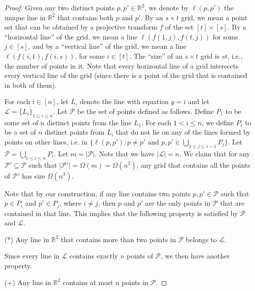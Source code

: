 \documentclass[10pt,a4paper]{amsart}
\begin{document}
\begin{proof}		
	Given any two distinct points $p,p'\in\mathbb{R}^2$, we denote by $\ell(p,p')$ the unique line in $\mathbb{R}^2$ that contains both $p$ and $p'$.
	By an $s\times t$ grid, we mean a point set that can be obtained by a projective transform $f$ of the set $[t]\times [s]$. By a ``horizontal line'' of the grid, we mean a line $\ell(f(1,j),f(t,j))$ for some $j\in [s]$, and by a ``vertical line'' of the grid, we mean a line $\ell(f(i,1),f(i,s))$, for some $i\in [t]$. The ``size'' of an $s\times t$ grid is $st$, i.e., the number of points in it. Note that every horizontal line of a grid intersects every vertical line of the grid (since there is a point of the grid that is contained in both of them).
	
	\medskip	
	
	For each $i\in [n]$, let $L_i$ denote the line with equation $y=i$ and let $\mathcal{L}=\{L_i\}_{1\leq i\leq n}$.
	Let $\mathcal{P}$ be the set of points defined as follows. Define $P_1$ to be some set of $n$ distinct points from the line $L_1$. For each $1<i\leq n$, we define $P_i$ to be a set of $n$ distinct points from $L_i$ that do not lie on any of the lines formed by points on other lines, i.e. in $\{\ell(p,p')\colon p\neq p'$ and $p,p'\in\bigcup_{1\leq j\leq i-1} P_j\}$. Let $\mathcal{P}=\bigcup_{1\leq i\leq n} P_i$. Let $m=|\mathcal{P}|$. Note that we have $|\mathcal{L}|=n$. We claim that for any $\mathcal{P}'\subseteq\mathcal{P}$ such that $|\mathcal{P'}|=\Omega(m)=\Omega(n^2)$, any grid that contains all the points of $\mathcal{P}'$ has size $\Omega(n^3)$. 
	
	\medskip		
	
	Note that by our construction, if any line contains two points $p,p'\in\mathcal{P}$ such that $p\in P_i$ and $p'\in P_j$, where $i\neq j$, then $p$ and $p'$ are the only points in $\mathcal{P}$ that are contained in that line. This implies that the following property is satisfied by $\mathcal{P}$ and $\mathcal{L}$.
	\medskip
	
	\noindent (*) Any line in $\mathbb{R}^2$ that contains more than two points in $\mathcal{P}$ belongs to $\mathcal{L}$.
	\medskip
	
	Since every line in $\mathcal{L}$ contains exactly $n$ points of $\mathcal{P}$, we then have another property.
	\medskip
	
	\noindent (+) Any line in $\mathbb{R}^2$ contains at most $n$ points in $\mathcal{P}$.
	\medskip
	

\end{proof}
\end{document}
